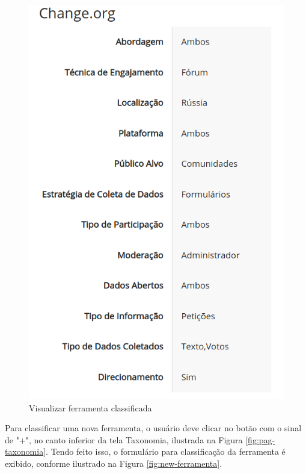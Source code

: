 \begin{figure}[!ht]
    \centering
    \includegraphics[scale=0.20]{./figuras/show-ferramenta.png}
    \caption{Visualizar ferramenta classificada}
    \label{fig:show-ferramenta}
\end{figure}


\par
Para classificar uma nova ferramenta, o usuário deve clicar no botão com o  sinal de "+", no canto inferior da tela Taxonomia, ilustrada na Figura \ref{fig:pag-taxonomia}. 
Tendo feito isso, o formulário para classificação da ferramenta é exibido, conforme ilustrado na Figura \ref{fig:new-ferramenta}. 

